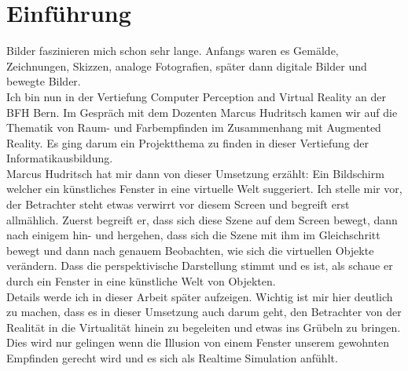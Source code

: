 \section{Einführung}

Bilder faszinieren mich schon sehr lange. Anfangs waren es Gemälde, Zeichnungen, Skizzen, analoge Fotografien, später dann digitale Bilder und bewegte Bilder. \\ 
Ich bin nun in der Vertiefung Computer Perception and Virtual Reality an der BFH Bern. Im Gespräch mit dem Dozenten Marcus Hudritsch kamen wir auf die Thematik von Raum- und Farbempfinden im Zusammenhang mit Augmented Reality. Es ging darum ein Projektthema zu finden in dieser Vertiefung der Informatikausbildung. \\
Marcus Hudritsch hat mir dann von dieser Umsetzung erzählt: Ein Bildschirm welcher ein künstliches Fenster in eine virtuelle Welt suggeriert.
Ich stelle mir vor, der Betrachter steht etwas verwirrt vor diesem Screen und begreift erst allmählich. Zuerst begreift er, dass sich diese Szene auf dem Screen bewegt, dann nach einigem hin- und hergehen, dass sich die Szene mit ihm im Gleichschritt bewegt und dann nach genauem Beobachten, wie sich die virtuellen Objekte verändern. Dass die perspektivische Darstellung stimmt und es ist, als schaue er durch ein Fenster in eine künstliche Welt von Objekten. \\ Details werde ich in dieser Arbeit später aufzeigen. Wichtig ist mir hier deutlich zu machen, dass es in dieser Umsetzung auch darum geht, den Betrachter von der Realität in die Virtualität hinein zu begeleiten und etwas ins Grübeln zu bringen. \\ Dies wird nur gelingen wenn die Illusion von einem Fenster unserem gewohnten Empfinden gerecht wird und es sich als Realtime Simulation anfühlt.
